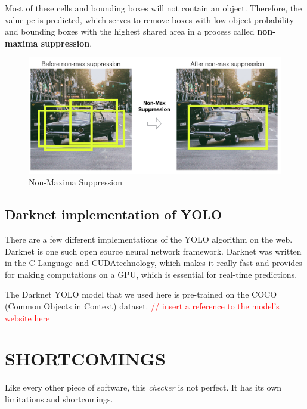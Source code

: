 \documentclass[a4paper]{article}
\begin{document}
Most of these cells and bounding boxes will not contain an object. Therefore, the value pc is predicted, which serves to remove boxes with low object probability and bounding boxes with the highest shared area in a process called \textbf{non-maxima suppression}.

\begin{figure}[h!]
    \centering
    \includegraphics[width=\linewidth]{Pictures/yoloWorks3.png}
    \caption{Non-Maxima Suppression}
    \label{fig4:NMS}
\end{figure}
\pagebreak
\subsection{Darknet implementation of YOLO}
There are a few different implementations of the YOLO algorithm on the web. Darknet is one such open source neural network framework. Darknet was written in the C Language and CUDAtechnology, which makes it really fast and provides for making computations on a GPU, which is essential for real-time predictions.

The Darknet YOLO model that we used here is pre-trained on the COCO (Common Objects in Context) dataset. \textcolor{red}{// insert a reference to the model's website here}
\newpage

\section{SHORTCOMINGS}

Like every other piece of software, this \textit{checker} is not perfect. It has its own limitations and shortcomings.
\end{document}
